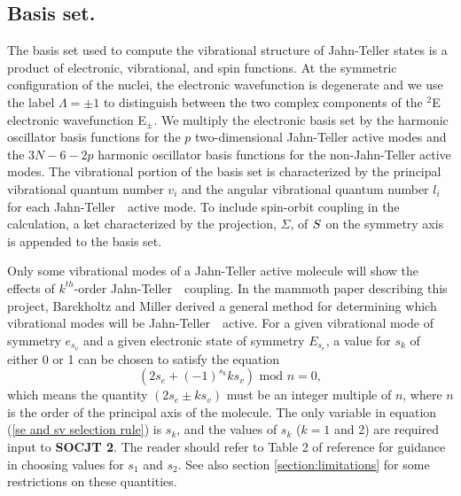 \documentclass{article}
\newcommand{\JT}{Jahn-Teller\ }
\newcommand{\socjttwo}{{\bf SOCJT 2}}
\begin{document}
\subsection{Basis set.} The basis set used to compute the vibrational 
structure of Jahn-Teller states is a product of electronic, vibrational,
and spin functions. At the symmetric configuration of the nuclei, 
the electronic wavefunction is degenerate and we use the label
$\Lambda = \pm 1$ to distinguish between the 
two complex components of the $^2$E electronic wavefunction E$_\pm$. 
We multiply the electronic basis set by the harmonic oscillator basis
functions for the $p$ two-dimensional Jahn-Teller active modes and the
$3N-6-2p$ harmonic oscillator basis functions for the non-Jahn-Teller
active modes. The vibrational portion of the basis set is
characterized by the principal vibrational quantum number $v_i$ and
the angular vibrational quantum number $l_i$ for each \JT\ active mode.
To include spin-orbit coupling in the calculation,
a ket characterized by the projection, $\Sigma $, of ${\bf S}$ on the 
symmetry axis is appended to the basis set.

Only some vibrational modes of a Jahn-Teller active molecule will show
the effects of $k^{th}$-order \JT\ coupling. In the mammoth paper
describing this 
project, Barckholtz and Miller derived a general method for determining which vibrational
modes will be \JT\ active. For a given vibrational mode of symmetry
$e_{s_v}$ and  a given electronic state of symmetry $E_{s_e}$, a value
for $s_k$ of either 0 or 1 can be chosen to satisfy the equation
\begin{equation}
\left( 2s_e + (-1)^{s_k } ks_v \right) \text{ mod } n=0,
\label{se and sv selection rule}
\end{equation}
which means the quantity $\left( 2s_e \pm ks_v \right) $
must be an integer multiple of $n$, where $n$ is the order of the
principal axis of the molecule. The only variable in equation (\ref{se
  and sv selection rule}) is $s_k$, and the values of $s_k$ ($k=1$ and 2)
are required input to \socjttwo. The reader should refer to Table 2 of
reference  for guidance in choosing values for $s_1$ and
$s_2$. See also section \ref{section:limitations} for some
restrictions on these quantities.
\end{document}
